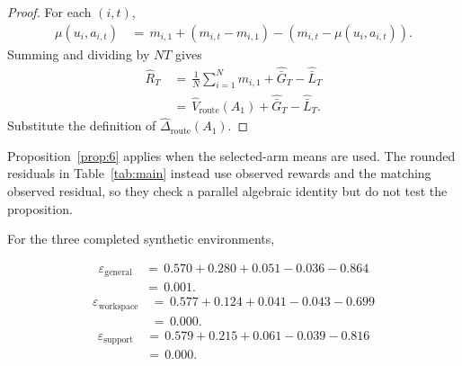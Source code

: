 \documentclass{article} %
\begin{document}
\begin{proof}
For each \((i,t)\),
\begin{equation}
\begin{aligned}
\mu(u_i,a_{i,t})
&\,=\,
m_{i,1}
+
(m_{i,t}-m_{i,1})
-
(m_{i,t}-\mu(u_i,a_{i,t})).
\end{aligned}
\end{equation}
Summing and dividing by \(NT\) gives
\begin{equation}
\begin{aligned}
\widehat R_T
&\,=\,
\frac{1}{N}
\sum_{i=1}^{N}
m_{i,1}
+
\widehat{\bar G}_T
-
\widehat{\bar L}_T
\\
&\,=\,
\widehat V_{\mathrm{route}}(A_1)
+
\widehat{\bar G}_T
-
\widehat{\bar L}_T.
\end{aligned}
\end{equation}
Substitute the definition of \(\widehat\Delta_{\mathrm{route}}(A_1)\).
\end{proof}

Proposition~\ref{prop:6} applies when the selected-arm means are used. The
rounded residuals in Table~\ref{tab:main} instead use observed rewards and the
matching observed residual, so they check a parallel algebraic identity but do
not test the proposition.

For the three completed synthetic environments,

\begin{equation}
\label{eq:app-fourth-residual-general}
\begin{aligned}
\varepsilon_{\mathrm{general}}
&\,=\,
0.570+0.280+0.051-0.036-0.864
\\
&\,=\,
0.001.
\end{aligned}
\end{equation}
\begin{equation}
\label{eq:app-fourth-residual-workspace}
\begin{aligned}
\varepsilon_{\mathrm{workspace}}
&\,=\,
0.577+0.124+0.041-0.043-0.699
\\
&\,=\,
0.000.
\end{aligned}
\end{equation}
\begin{equation}
\label{eq:app-fourth-residual-support}
\begin{aligned}
\varepsilon_{\mathrm{support}}
&\,=\,
0.579+0.215+0.061-0.039-0.816
\\
&\,=\,
0.000.
\end{aligned}
\end{equation}
\end{document}
